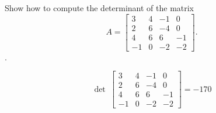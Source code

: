 
\begin{exerciseStatement}


Show how to compute the determinant of the matrix \[A= \left[\begin{array}{cccc}
3 & 4 & -1 & 0 \\
2 & 6 & -4 & 0 \\
4 & 6 & 6 & -1 \\
-1 & 0 & -2 & -2
\end{array}\right] .\].


\end{exerciseStatement}
    
\begin{exerciseAnswer} 
\[\operatorname{det}\  \left[\begin{array}{cccc}
3 & 4 & -1 & 0 \\
2 & 6 & -4 & 0 \\
4 & 6 & 6 & -1 \\
-1 & 0 & -2 & -2
\end{array}\right] = -170 \]
\end{exerciseAnswer}
    
